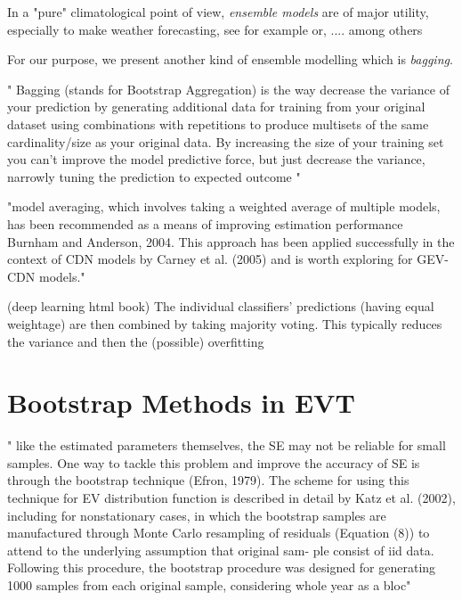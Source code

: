 In a "pure" climatological point of view, \emph{ensemble models} are of major utility, especially to make weather forecasting, see for example \citet{suh_development_2012} or, .... among others

For our purpose, we present another kind of ensemble modelling which is \emph{bagging}.

" Bagging (stands for Bootstrap Aggregation) is the way decrease the variance of your prediction by generating additional data for training from your original dataset using combinations with repetitions to produce multisets of the same cardinality/size as your original data. By increasing the size of your training set you can't improve the model predictive force, but just decrease the variance, narrowly tuning the prediction to expected outcome "


"model averaging, which involves taking a weighted average of
multiple models, has been recommended as a means of
improving estimation performance Burnham and Anderson, 2004. This approach has been applied successfully
in the context of CDN models by Carney et al. (2005)
and is worth exploring for GEV-CDN models."


\citet[pp.256-267]{Goodfellow-et-al-2016}  (deep learning html book)    The  individual  classifiers’  predictions  (having
equal  weightage)  are  then  combined  by  taking  majority voting. This typically reduces the variance and then the (possible) overfitting






\section{Bootstrap Methods in EVT}

" like
the estimated parameters themselves, the SE may not be
reliable for small samples. One way to tackle this problem and improve the accuracy of SE is through the bootstrap technique (Efron, 1979). The scheme for using this technique for EV distribution  function is described in detail by Katz et al. (2002), including for nonstationary cases,
in which the bootstrap samples are manufactured through
Monte  Carlo  resampling  of  residuals  (Equation (8))  to attend  to  the  underlying  assumption  that  original  sam-
ple  consist  of  iid  data.  Following  this procedure,  the bootstrap  procedure  was  designed  for  generating  1000
samples  from  each  original  sample,  considering  whole year  as  a  bloc"


